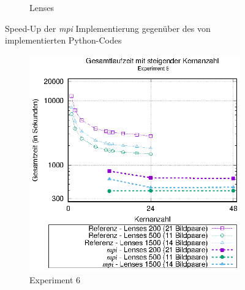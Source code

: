 \begin{center}
\begin{figure}[h]
\begin{subfigure}[b]{0.45\textwidth}
			\caption{Lenses}
			\label{fig:mpi_speedup_lenses}
		\end{subfigure}
		\caption{Speed-Up der \textit{mpi} Implementierung gegenüber des von \citeauthor{Coj17} implementierten Python-Codes}
		\label{fig:mpi_speedup}
	\end{figure}
\end{center}

\begin{center}
	\begin{figure}[h]
		\begin{subfigure}[b]{0.45\textwidth}
			\centering
			\includegraphics[width=\textwidth]{pdf/mpi_times_exp6}
			\caption{Experiment 6}
			\label{fig:mpi_times_exp6}
		\end{subfigure}
		\hfill
		\begin{subfigure}[b]{0.45\textwidth}
			\centering

\end{subfigure}
\end{figure}
\end{center}
